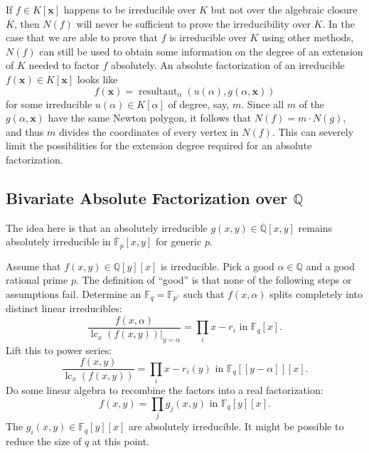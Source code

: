 \documentclass[11pt,reqno]{amsart}
\numberwithin{equation}{section}
\begin{document}
If $f \in K[\pmb{x}]$ happens to be irreducible over $K$ but not over the
algebraic closure $\overline{K}$, then $N(f)$ will never be sufficient to prove
the irreducibility over $K$. In the case that we are able to prove that $f$ is 
irreducible over $K$ using other methods, $N(f)$ can still be used to obtain
some information on the degree of an extension of $K$ needed to factor $f$
absolutely. An absolute factorization of an irreducible
$f(\pmb{x}) \in K[\pmb{x}]$ looks like
\begin{equation*}
f(\pmb{x}) = \operatorname{resultant}_{\alpha} (u(\alpha), g(\alpha, \pmb{x}))
\end{equation*}
for some irreducible $u(\alpha) \in K[\alpha]$ of degree, say, $m$. Since all
$m$ of the $g(\alpha, \pmb{x})$ have the same Newton polygon, it follows that
$N(f)=m\cdot N(g)$, and thus $m$ divides the coordinates of every vertex in
$N(f)$. This can severely limit the possibilities for the extension degree
required for an absolute factorization.

\subsection{Bivariate Absolute Factorization over $\mathbb{Q}$}
The idea here is that an absolutely irreducible
$g(x,y) \in \overline{\mathbb{Q}}[x,y]$ remains absolutely irreducible in
$\overline{\mathbb{F}}_p[x,y]$ for generic $p$.

Assume that $f(x,y) \in \mathbb{Q}[y][x]$ is irreducible. Pick a good
$\alpha \in \mathbb{Q}$ and a good rational prime $p$. The definition of
``good'' is that none of the following steps or assumptions fail. Determine an 
$\mathbb{F}_q = \mathbb{F}_{p^?}$ such that $f(x,\alpha)$ splits completely
into distinct linear irreducibles:
\begin{equation*}
\frac{f(x,\alpha)}{\operatorname{lc}_x(f(x,y)) |_{y=\alpha}} = \prod_i x - r_i \text{ in } \mathbb{F}_q[x]\text{.}
\end{equation*}
Lift this to power series:
\begin{equation*}
\frac{f(x,y)}{\operatorname{lc}_x(f(x,y))} = \prod_i x - r_i(y) \text{ in } \mathbb{F}_q[[y-\alpha]][x]\text{.}
\end{equation*}
Do some linear algebra to recombine the factors into a real factorization:
\begin{equation*}
f(x,y) = \prod_j g_j(x,y) \text{ in } \mathbb{F}_q[y][x]\text{.}
\end{equation*}
The $g_i(x,y) \in \mathbb{F}_q[y][x]$ are absolutely irreducible. It might be
possible to reduce the size of $q$ at this point.
\end{document}
